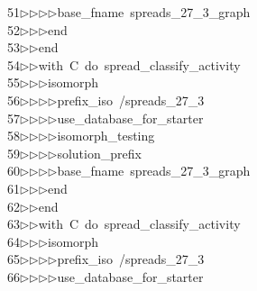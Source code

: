 \begin{tabbing}
51\>$\triangleright$\>$\triangleright$\>$\triangleright$\>$\triangleright$\>base\_fname\ spreads\_27\_3\_graph\ \\[0pt]
52\>$\triangleright$\>$\triangleright$\>$\triangleright$\>end\ \\[0pt]
53\>$\triangleright$\>$\triangleright$\>end\ \\[0pt]
54\>$\triangleright$\>$\triangleright$\>with\ C\ do\ spread\_classify\_activity\ \\[0pt]
55\>$\triangleright$\>$\triangleright$\>$\triangleright$\>isomorph\ \\[0pt]
56\>$\triangleright$\>$\triangleright$\>$\triangleright$\>$\triangleright$\>prefix\_iso\ /spreads\_27\_3\ \\[0pt]
57\>$\triangleright$\>$\triangleright$\>$\triangleright$\>$\triangleright$\>use\_database\_for\_starter\ \\[0pt]
58\>$\triangleright$\>$\triangleright$\>$\triangleright$\>$\triangleright$\>isomorph\_testing\ \\[0pt]
59\>$\triangleright$\>$\triangleright$\>$\triangleright$\>$\triangleright$\>solution\_prefix\ \ \\[0pt]
60\>$\triangleright$\>$\triangleright$\>$\triangleright$\>$\triangleright$\>base\_fname\ spreads\_27\_3\_graph\ \\[0pt]
61\>$\triangleright$\>$\triangleright$\>$\triangleright$\>end\ \\[0pt]
62\>$\triangleright$\>$\triangleright$\>end\ \\[0pt]
63\>$\triangleright$\>$\triangleright$\>with\ C\ do\ spread\_classify\_activity\ \\[0pt]
64\>$\triangleright$\>$\triangleright$\>$\triangleright$\>isomorph\ \\[0pt]
65\>$\triangleright$\>$\triangleright$\>$\triangleright$\>$\triangleright$\>prefix\_iso\ /spreads\_27\_3\ \\[0pt]
66\>$\triangleright$\>$\triangleright$\>$\triangleright$\>$\triangleright$\>use\_database\_for\_starter\ \\[0pt]

\end{tabbing}
